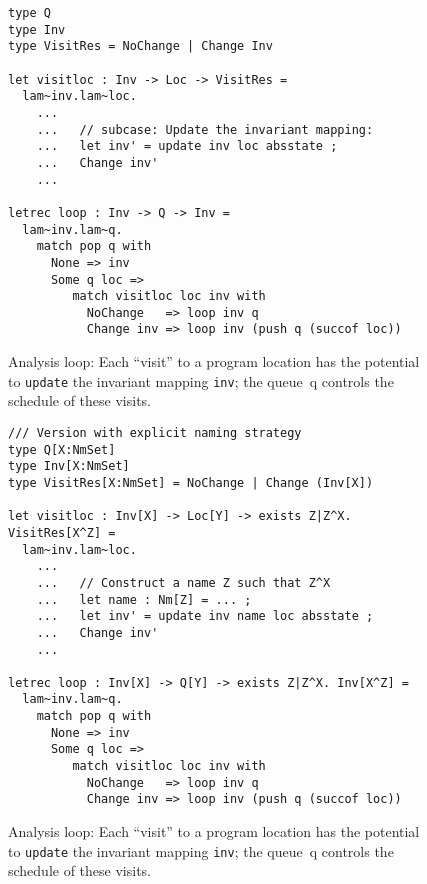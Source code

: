 \documentclass[acmlarge,anonymous]{acmart}\settopmatter{printfolios=true}
\newcommand{\code}[1]{\lstinline[basicstyle=\ttfamily]|#1|}
\begin{document}
\begin{figure}
\begin{lstlisting}
type Q
type Inv
type VisitRes = NoChange | Change Inv

let visitloc : Inv -> Loc -> VisitRes =
  lam~inv.lam~loc.
    ...
    ...   // subcase: Update the invariant mapping:
    ...   let inv' = update inv loc absstate ;
    ...   Change inv'
    ...

letrec loop : Inv -> Q -> Inv =
  lam~inv.lam~q.
    match pop q with
      None => inv
      Some q loc =>
         match visitloc loc inv with
           NoChange   => loop inv q
           Change inv => loop inv (push q (succof loc))    
\end{lstlisting}
\caption{Analysis loop: Each ``visit'' to a program location has the
  potential to \code{update} the invariant mapping \code{inv}; the
  queue~{q} controls the schedule of these visits. }
\end{figure}

\begin{figure}
\begin{lstlisting}
/// Version with explicit naming strategy
type Q[X:NmSet]
type Inv[X:NmSet]
type VisitRes[X:NmSet] = NoChange | Change (Inv[X])

let visitloc : Inv[X] -> Loc[Y] -> exists Z|Z^X. VisitRes[X^Z] =
  lam~inv.lam~loc.
    ...
    ...   // Construct a name Z such that Z^X
    ...   let name : Nm[Z] = ... ;
    ...   let inv' = update inv name loc absstate ;
    ...   Change inv'
    ...

letrec loop : Inv[X] -> Q[Y] -> exists Z|Z^X. Inv[X^Z] =
  lam~inv.lam~q.
    match pop q with
      None => inv
      Some q loc =>
         match visitloc loc inv with
           NoChange   => loop inv q
           Change inv => loop inv (push q (succof loc))
\end{lstlisting}
\caption{Analysis loop: Each ``visit'' to a program location has the
  potential to \code{update} the invariant mapping \code{inv}; the
  queue~{q} controls the schedule of these visits. }
\end{figure}

\newcommand{\TabYes}{\ensuremath{\blacksquare}}
\newcommand{\TabNo}{\ensuremath{\square}}
\end{document}
